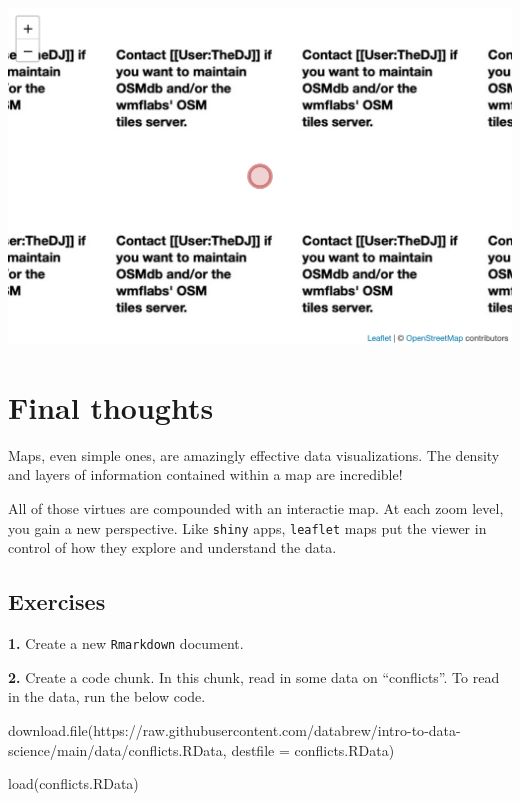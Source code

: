\documentclass[
]{book}
\newenvironment{Shaded}{\begin{snugshade}}{\end{snugshade}}
\newcommand{\AttributeTok}[1]{\textcolor[rgb]{0.77,0.63,0.00}{#1}}
\newcommand{\FunctionTok}[1]{\textcolor[rgb]{0.00,0.00,0.00}{#1}}
\newcommand{\NormalTok}[1]{#1}
\newcommand{\StringTok}[1]{\textcolor[rgb]{0.31,0.60,0.02}{#1}}
\begin{document}
\includegraphics[width=694.08px]{figures/unnamed-chunk-239-1}

\hypertarget{final-thoughts-1}{%
\section*{Final thoughts}\label{final-thoughts-1}}

Maps, even simple ones, are amazingly effective data visualizations. The density and layers of information contained within a map are incredible!

All of those virtues are compounded with an interactie map. At each zoom level, you gain a new perspective. Like \texttt{shiny} apps, \texttt{leaflet} maps put the viewer in control of how they explore and understand the data.

\hypertarget{exercises-9}{%
\subsection*{Exercises}\label{exercises-9}}

\textbf{1.} Create a new \texttt{Rmarkdown} document.

\textbf{2.} Create a code chunk. In this chunk, read in some data on ``conflicts''. To read in the data, run the below code.

\begin{Shaded}
\begin{Highlighting}[]
\FunctionTok{download.file}\NormalTok{(}\StringTok{\textquotesingle{}https://raw.githubusercontent.com/databrew/intro{-}to{-}data{-}science/main/data/conflicts.RData\textquotesingle{}}\NormalTok{,}
              \AttributeTok{destfile =} \StringTok{\textquotesingle{}conflicts.RData\textquotesingle{}}\NormalTok{)}

\FunctionTok{load}\NormalTok{(}\StringTok{\textquotesingle{}conflicts.RData\textquotesingle{}}\NormalTok{)}
\end{Highlighting}
\end{Shaded}
\end{document}
